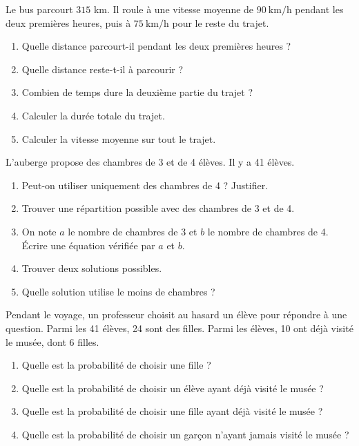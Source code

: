 \begin{exercice}
Le bus parcourt $315$ km. Il roule à une vitesse moyenne de $90\ \mathrm{km/h}$ pendant les deux premières heures, puis à $75\ \mathrm{km/h}$ pour le reste du trajet.

\begin{enumerate}
  \item Quelle distance parcourt-il pendant les deux premières heures ?
  \item Quelle distance reste-t-il à parcourir ?
  \item Combien de temps dure la deuxième partie du trajet ?
  \item Calculer la durée totale du trajet.
  \item Calculer la vitesse moyenne sur tout le trajet.
\end{enumerate}
\end{exercice}

\begin{exercice}
L'auberge propose des chambres de 3 et de 4 élèves. Il y a 41 élèves.

\begin{enumerate}
  \item Peut-on utiliser uniquement des chambres de 4 ? Justifier.
  \item Trouver une répartition possible avec des chambres de 3 et de 4.
  \item On note $a$ le nombre de chambres de 3 et $b$ le nombre de chambres de 4. Écrire une équation vérifiée par $a$ et $b$.
  \item Trouver deux solutions possibles.
  \item Quelle solution utilise le moins de chambres ?
\end{enumerate}
\end{exercice}

\begin{exercice}
Pendant le voyage, un professeur choisit au hasard un élève pour répondre à une question. Parmi les 41 élèves, 24 sont des filles. Parmi les élèves, 10 ont déjà visité le musée, dont 6 filles.

\begin{enumerate}
  \item Quelle est la probabilité de choisir une fille ?
  \item Quelle est la probabilité de choisir un élève ayant déjà visité le musée ?
  \item Quelle est la probabilité de choisir une fille ayant déjà visité le musée ?
  \item Quelle est la probabilité de choisir un garçon n'ayant jamais visité le musée ?
\end{enumerate}
\end{exercice}

